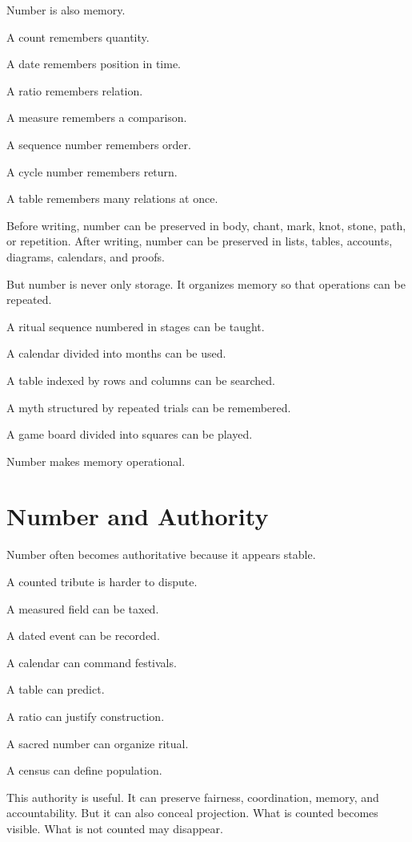 \documentclass[11pt]{book}
\begin{document}
Number is also memory.

A count remembers quantity.

A date remembers position in time.

A ratio remembers relation.

A measure remembers a comparison.

A sequence number remembers order.

A cycle number remembers return.

A table remembers many relations at once.

Before writing, number can be preserved in body, chant, mark, knot, stone, path, or repetition. After writing, number can be preserved in lists, tables, accounts, diagrams, calendars, and proofs.

But number is never only storage. It organizes memory so that operations can be repeated.

A ritual sequence numbered in stages can be taught.

A calendar divided into months can be used.

A table indexed by rows and columns can be searched.

A myth structured by repeated trials can be remembered.

A game board divided into squares can be played.

Number makes memory operational.

\section{Number and Authority}

Number often becomes authoritative because it appears stable.

A counted tribute is harder to dispute.

A measured field can be taxed.

A dated event can be recorded.

A calendar can command festivals.

A table can predict.

A ratio can justify construction.

A sacred number can organize ritual.

A census can define population.

This authority is useful. It can preserve fairness, coordination, memory, and accountability. But it can also conceal projection. What is counted becomes visible. What is not counted may disappear.
\end{document}
